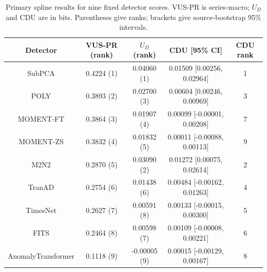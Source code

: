 \begin{table}[t]
\centering
\small
\caption{Primary spline results for nine fixed detector scores. VUS-PR is series-macro; $U_D$ and CDU are in bits. Parentheses give ranks; brackets give source-bootstrap 95\% intervals.}
\label{tab:main}
\setlength{\tabcolsep}{7pt}
\begin{tabular}{ccccc}
\toprule
Detector & VUS-PR (rank) & $U_D$ (rank) & CDU [95\% CI] & CDU rank \\
\midrule
SubPCA & 0.4224 (1) & 0.04060 (1) & 0.01509 [0.00256, 0.02964] & 1 \\
POLY & 0.3893 (2) & 0.02700 (3) & 0.00604 [0.00246, 0.00969] & 3 \\
MOMENT-FT & 0.3864 (3) & 0.01907 (4) & 0.00099 [-0.00001, 0.00208] & 7 \\
MOMENT-ZS & 0.3832 (4) & 0.01832 (5) & 0.00011 [-0.00088, 0.00113] & 9 \\
M2N2 & 0.2870 (5) & 0.03090 (2) & 0.01272 [0.00075, 0.02614] & 2 \\
TranAD & 0.2754 (6) & 0.01438 (6) & 0.00484 [-0.00162, 0.01263] & 4 \\
TimesNet & 0.2627 (7) & 0.00591 (8) & 0.00133 [-0.00015, 0.00300] & 5 \\
FITS & 0.2464 (8) & 0.00598 (7) & 0.00109 [-0.00008, 0.00221] & 6 \\
AnomalyTransformer & 0.1118 (9) & -0.00005 (9) & 0.00015 [-0.00129, 0.00167] & 8 \\
\bottomrule
\end{tabular}
\end{table}
